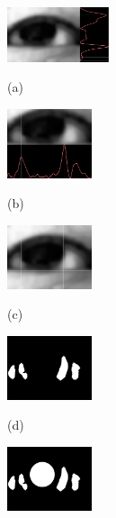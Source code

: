 \documentclass[sigconf]{acmart}
\begin{document}
\begin{figure}[t]
\begin{minipage}[b]{.32\linewidth}
  \centering
  \centerline{\includegraphics[width=3cm]{../Fig/IrisRegionExtraction_GPF/Deriv_hy_result.png}}
  \centerline{(a)}\medskip
\end{minipage}
\hfill
\begin{minipage}[b]{0.32\linewidth}
  \centering
  \centerline{\includegraphics[width=2.5cm]{../Fig/IrisRegionExtraction_GPF/Deriv_vx_result.png}}
  \centerline{(b)}\medskip
\end{minipage}
%
\hfill
\begin{minipage}[b]{0.32\linewidth}
  \centering
  \centerline{\includegraphics[width=2.5cm]{../Fig/IrisRegionExtraction_GPF/Resulted_irisRegionExtraction.jpg}}
  \centerline{(c)}\medskip
\end{minipage}
%
\vfill
\begin{minipage}[b]{0.32\linewidth}
  \centering
  \centerline{\includegraphics[width=2.5cm]{../Fig/EyelidDetection/RefinedGradX_EyeRegion.jpg}}
  \centerline{(d)}\medskip
\end{minipage}
\hfill
\begin{minipage}[b]{0.32\linewidth}
  \centering
  \centerline{\includegraphics[width=2.5cm]{../Fig/EyelidDetection/RefinedGradX_EyeRegion_Plus_IrisCenter.jpg}}

\end{minipage}
\end{figure}
\end{document}
